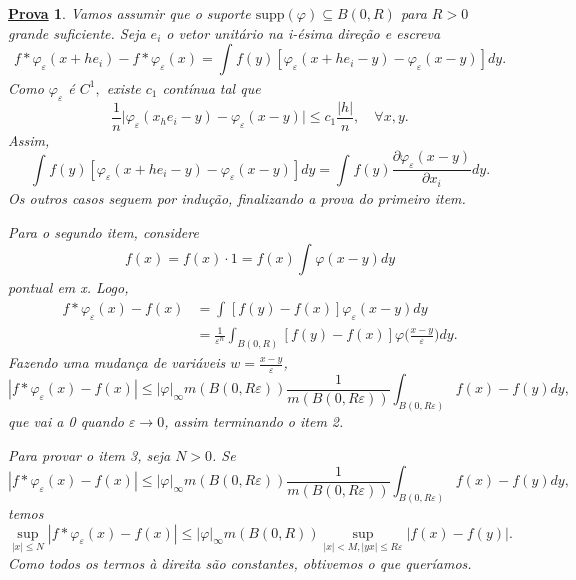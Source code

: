 \documentclass{article}
\newtheorem*{proof*}{\underline{Prova}}
\begin{document}
\begin{proof*}
  Vamos assumir que o suporte \(\mathrm{supp}(\varphi )\subseteq B(0, R)\) para \(R>0\) grande suficiente. Seja \(e_{i}\) o vetor unitário na i-ésima direção e escreva 
  \[
    f*\varphi_{\varepsilon }(x+he_{i}) - f*\varphi_{\varepsilon }(x) = \int_{}^{}f(y)[\varphi_{\varepsilon }(x+he_{i}-y) - \varphi_{\varepsilon }(x-y)]dy.
  \]
  Como \(\varphi_{\varepsilon }\) é \(C^{1},\) existe \(c_{1}\) contínua tal que 
  \[
    \frac{1}{n}\biggl\vert \varphi _{\varepsilon }(x_he_{i}-y) - \varphi _{\varepsilon }(x-y) \biggr\vert\leq c_1\frac{|h|}{n},\quad \forall x, y.
  \]
  Assim, 
    \[
       \int_{}^{}f(y)[\varphi_{\varepsilon }(x+he_{i}-y) - \varphi_{\varepsilon }(x-y)]dy = \int_{}^{}f(y)\frac{\partial \varphi_{\varepsilon }(x-y)}{\partial x_{i}}dy.
    \]
  Os outros casos seguem por indução, finalizando a prova do primeiro item.

  Para o segundo item, considere
    \[
      f(x) = f(x)\cdot 1=f(x)\int_{}^{}\varphi (x-y)dy 
    \]
  pontual em x. Logo,
  \begin{align*}
    f*\varphi_{\varepsilon }(x) - f(x) &= \int_{}^{}[f(y)-f(x)]\varphi_\varepsilon  (x-y)dy\\ 
                                       &= \frac{1}{\varepsilon ^{n}}\int_{B(0, R)}^{}[f(y)-f(x)]\varphi \biggl(\frac{x-y}{\varepsilon }\biggr)dy.
  \end{align*}
  Fazendo uma mudança de variáveis \(w=\frac{x-y}{\varepsilon }\), 
  \[
   |f*\varphi _{\varepsilon }(x)-f(x)|\leq |\varphi |_{\infty}m(B(0, R\varepsilon ))\frac{1}{m(B(0, R\varepsilon ))}\int_{B(0, R\varepsilon )}^{}f(x)-f(y)dy,
  \]
  que vai a 0 quando \(\varepsilon \to 0\), assim terminando o item 2. 

  Para provar o item 3, seja \(N > 0\). Se 
  \[
   |f*\varphi _{\varepsilon }(x)-f(x)|\leq |\varphi |_{\infty}m(B(0, R\varepsilon ))\frac{1}{m(B(0, R\varepsilon ))}\int_{B(0, R\varepsilon )}^{}f(x)-f(y)dy,
  \]
  temos 
    \[
      \sup_{|x|\leq N}|f*\varphi_{\varepsilon }(x) - f(x)|\leq |\varphi |_{\infty}m(B(0, R))\sup_{|x|<M, |yx|\leq R\varepsilon }|f(x)-f(y)|.
    \]
  Como todos os termos à direita são constantes, obtivemos o que queríamos.
  

\end{proof*}
\end{document}
